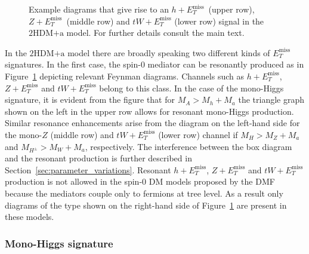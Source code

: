 \documentclass[review]{elsarticle}
\newcommand{\MET}{\ensuremath{E_T^\mathrm{miss}}\xspace}
\newcommand{\hdma}{\ensuremath{\textrm{2HDM+a}}\xspace}
\begin{document}
\begin{figure}[t!]
\vspace{4mm}
\caption{\label{fig:resonant} Example diagrams that give rise to an $h+\MET$~(upper row), $Z+\MET$~(middle row) and $tW + \MET$ (lower row) signal in the \hdma model. For further details consult the main text. }
\end{figure}

In the \hdma model there are broadly speaking two different kinds of $\MET$ signatures. In the first case, the spin-0 mediator can be resonantly produced as in Figure~\ref{fig:resonant} depicting relevant Feynman diagrams. Channels such as $h+\MET$, $Z+ \MET$ and $tW+\MET$ belong to this class. In the case of the mono-Higgs signature, it is evident from the figure that for $M_A > M_h + M_a$ the triangle  graph shown on the left in the upper row  allows for resonant mono-Higgs production.  Similar resonance enhancements arise from the diagram on the left-hand side for the mono-$Z$ (middle row) and $tW+\MET$ (lower row) channel if $M_H > M_Z + M_a$ and $M_{H^\pm} > M_W + M_a$, respectively. The interference between the box diagram and the resonant production is further described in Section~\ref{sec:parameter_variations}. Resonant $h+\MET$, $Z+\MET$ and $tW+\MET$ production is not allowed in the spin-0 DM models proposed by the DMF because the mediators couple only to fermions at tree level. As a result only diagrams of the type shown on the right-hand side of Figure~\ref{fig:resonant} are present in these models. 

\subsubsection{Mono-Higgs signature}
\end{document}

